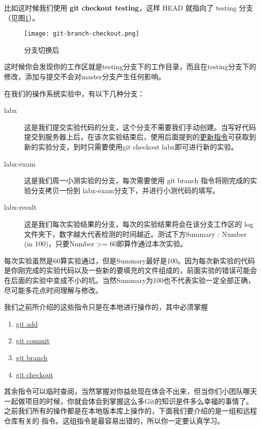 比如这时候我们使用 \textbf{git checkout testing}，这样 HEAD 就指向了 testing 分支（见图\ref{git-branch-checkout.png}）。

\begin{figure}[htbp]
  \centering
  \texttt{[image: git-branch-checkout.png]}
  \caption{分支切换后}\label{git-branch-checkout.png}
\end{figure}

这时候你会发现你的工作区就是testing分支下的工作目录，而且在testing分支下的修改，添加与提交不会对master分支产生任何影响。

在我们的操作系统实验中，有以下几种分支：
\begin{description}
\item[labx] 这是我们提交实验代码的分支，这个分支不需要我们手动创建。当写好代码提交到服务器上后，在该次实验结束后，使用后面提到的\hyperref[更新指令]{更新指令}可获取到新的实验分支，到时只需要使用git checkout labx即可进行新的实验。
\item[labx-exam] 这是我们周一小测实验的分支，每次需要使用 git branch 指令将刚完成的实验分支拷贝一份到 labx-exam分支下，并进行小测代码的填写。
\item[labx-result] 这是我们每次实验结果的分支，每次的实验结果将会在该分支工作区的 log 文件夹下，数字越大代表检测的时间越近。测试下方Summary : Number (in 100)，只要Number >= 60即算作通过本次实验。
\end{description}

\begin{note}
每次实验虽然是60算实验通过，但是Summary最好是100。因为每次新实验的代码是你刚完成的实验代码以及一些新的要填充的文件组成的，前面实验的错误可能会在后面的实验中变成不小的坑。当然Summary为100也不代表实验一定全部正确，尽可能多花点时间理解与修改。
\end{note}

我们之前所介绍的这些指令只是在本地进行操作的，其中必须掌握

\begin{enumerate}
  \item \hyperref[git add]{git add}
  \item \hyperref[git commit]{git commit}
  \item \hyperref[git branch]{git branch}
  \item \hyperref[git checkout]{git checkout}
\end{enumerate}

其余指令可以临时查阅，当然掌握对你益处现在体会不出来，但当你们小团队哪天一起做项目的时候，你就会体会到掌握这么多Git的知识是件多么幸福的事情了。之前我们所有的操作都是在本地版本库上操作的，下面我们要介绍的是一组和远程仓库有关的
指令。这组指令是最容易出错的，所以你一定要认真学习。


